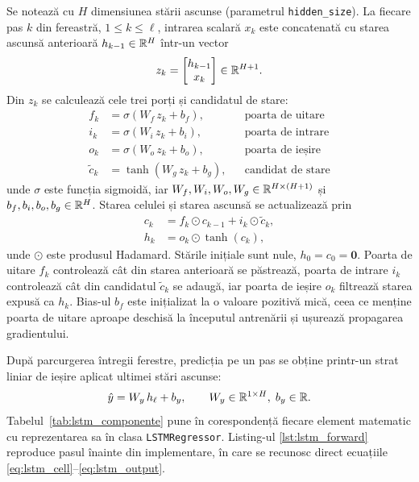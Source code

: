 Se notează cu $H$ dimensiunea stării ascunse (parametrul \texttt{hidden\_size}).
La fiecare pas $k$ din fereastră, $1 \le k \le \ell$, intrarea scalară $x_k$ este
concatenată cu starea ascunsă anterioară $h_{k-1} \in \mathbb{R}^{H}$ într-un vector
\begin{equation}
z_k = \begin{bmatrix} h_{k-1} \\ x_k \end{bmatrix} \in \mathbb{R}^{H+1}.
\end{equation}
Din $z_k$ se calculează cele trei porți și candidatul de stare:
\begin{align}
f_k &= \sigma\!\left(W_f\, z_k + b_f\right), &&\text{poarta de uitare} \\
i_k &= \sigma\!\left(W_i\, z_k + b_i\right), &&\text{poarta de intrare} \\
o_k &= \sigma\!\left(W_o\, z_k + b_o\right), &&\text{poarta de ieșire} \\
\tilde{c}_k &= \tanh\!\left(W_g\, z_k + b_g\right), &&\text{candidat de stare}
\end{align}
unde $\sigma$ este funcția sigmoidă, iar $W_f, W_i, W_o, W_g \in \mathbb{R}^{H\times(H+1)}$
și $b_f, b_i, b_o, b_g \in \mathbb{R}^{H}$. Starea celulei și starea ascunsă se
actualizează prin
\begin{align}
\label{eq:lstm_cell}
c_k &= f_k \odot c_{k-1} + i_k \odot \tilde{c}_k, \\
\label{eq:lstm_hidden}
h_k &= o_k \odot \tanh(c_k),
\end{align}
unde $\odot$ este produsul Hadamard. Stările inițiale sunt nule,
$h_0 = c_0 = \mathbf{0}$. Poarta de uitare $f_k$ controlează cât din starea
anterioară se păstrează, poarta de intrare $i_k$ controlează cât din candidatul
$\tilde{c}_k$ se adaugă, iar poarta de ieșire $o_k$ filtrează starea expusă ca
$h_k$. Bias-ul $b_f$ este inițializat la o valoare pozitivă mică, ceea ce
menține poarta de uitare aproape deschisă la începutul antrenării și ușurează
propagarea gradientului.

După parcurgerea întregii ferestre, predicția pe un pas se obține printr-un strat
liniar de ieșire aplicat ultimei stări ascunse:
\begin{equation}
\label{eq:lstm_output}
\hat{y} = W_y\, h_{\ell} + b_y, \qquad W_y \in \mathbb{R}^{1\times H},\; b_y \in \mathbb{R}.
\end{equation}
Tabelul~\ref{tab:lstm_componente} pune în corespondență fiecare element
matematic cu reprezentarea sa în clasa \texttt{LSTMRegressor}. Listing-ul
\ref{lst:lstm_forward} reproduce pasul înainte din implementare, în care se
recunosc direct ecuațiile \eqref{eq:lstm_cell}--\eqref{eq:lstm_output}.

